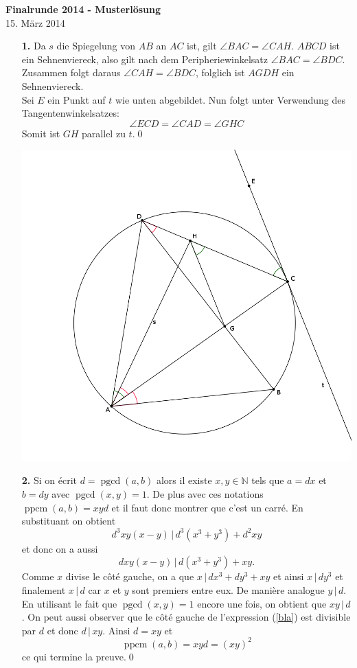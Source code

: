 \documentclass[12pt,a4paper]{article}
\theoremstyle{plain}
\theoremstyle{definition}
\DeclareMathOperator{\ppcm}{ppcm}
\DeclareMathOperator{\pgcd}{pgcd}
\renewcommand{\div}{\, | \,}
\newcommand{\N}{\mathbb{N}}
\begin{document}
\thispagestyle{empty}

\begin{center}
\Huge{\textbf{Finalrunde 2014 - Musterlösung}}\\ [0.7cm]
\large{15. März 2014}\\ [1.5cm]
\end{center}

\begin{itemize}
\item[\textbf{1.}]
Da $s$ die Spiegelung von $AB$ an $AC$ ist, gilt $\angle BAC=\angle CAH$. $ABCD$ ist ein Sehnenviereck, also gilt nach dem Peripheriewinkelsatz $\angle BAC=\angle BDC$. Zusammen folgt daraus $\angle CAH=\angle BDC$, folglich ist $AGDH$ ein Sehnenviereck.\\
Sei $E$ ein Punkt auf $t$ wie unten abgebildet. Nun folgt unter Verwendung des Tangentenwinkelsatzes:\\
\[\angle ECD= \angle CAD=\angle GHC\]
Somit ist $GH$ parallel zu $t$.\qed
\begin{center}
\includegraphics{Finalrunde14_1.png}
\end{center}


\item[\textbf{2.}]
Si on écrit $d=\pgcd(a,b)$ alors il existe $x,y\in\N$ tels que $a=dx$ et $b=dy$ avec $\pgcd(x,y)=1$. De plus avec ces notations $\ppcm(a,b) = xyd$ et il faut donc montrer que c'est un carré.
En substituant on obtient \[d^3xy(x-y) \div d^3 (x^3 + y^3)  + d^2 xy\] et donc on a aussi 
\begin{equation}\label{bla}
dxy(x-y)\div d(x^3 + y^3) + xy.
\end{equation}
Comme $x$ divise le côté gauche, on a que $x\div dx^3 + dy^3 + xy$ et ainsi $x\div dy^3$ et finalement $x\div d$ car $x$ et $y$ sont premiers entre eux. De manière analogue $y\div d$. En utilisant le fait que $\pgcd(x,y)=1$ encore une fois, on obtient que $xy\div d$. On peut aussi observer que le côté gauche de l'expression (\ref{bla}) est divisible par $d$ et donc $d\div xy$. Ainsi $d=xy$ et \[\ppcm(a,b) = xyd = (xy)^2\]
ce qui termine la preuve.\qed



\end{itemize}
\end{document}
